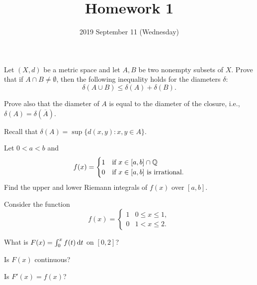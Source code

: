 \documentclass{../homework}
\title{Homework 1}
\date{2019 September 11 (Wednesday)}
\author{}
\begin{document}
\begin{problems}
\item Let \((X, d)\) be a metric space and let \(A, B\) be two
  nonempty subsets of \(X\).  Prove that if
  \(A \cap B \ne \emptyset\), then the following inequality holds for
  the diameters \(\delta\):
  \[
    \delta(A \cup B) \le \delta(A) + \delta(B).
  \]

  Prove also that the diameter of \(A\) is equal to the diameter of
  the closure, i.e., \(\delta(A) = \delta(\overline A)\).

  Recall that \(\delta(A) = \sup\{d(x, y) : x, y \in A\}\).

  \begin{solution}
  \end{solution}

\item Let \(0<a<b\) and
  \[
    f(x) =
    \begin{cases}
      1 & \text{if \(x \in [a, b] \cap \mathbb Q\)} \\
      0 & \text{if \(x \in [a, b]\) is irrational}.
    \end{cases}
  \]
  Find the upper and lower Riemann integrals of \(f(x)\) over
  \([a, b]\).

  \begin{solution}
  \end{solution}

\item Consider the function
  \[
    f(x) =
    \begin{cases}
      1 & 0 \le x \le 1, \\
      0 & 1 < x \le 2.
    \end{cases}
  \]
  \begin{problems}
  \item What is \(F(x) = \int_0^x f(t) \mathop{}\!\mathrm d t\) on \([0, 2]\)?

    \begin{solution}
    \end{solution}

  \item Is \(F(x)\) continuous?

    \begin{solution}
    \end{solution}

  \item Is \(F'(x) = f(x)\)?

    \begin{solution}
    \end{solution}
  \end{problems}


\end{problems}
\end{document}
